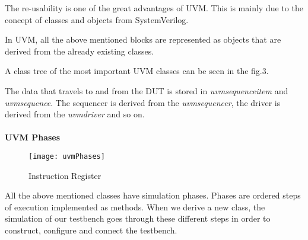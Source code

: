 \documentclass[a4paper,11pt]{article}
\begin{document}
The re-usability is one of the great advantages of UVM. This is mainly due to the concept of classes and objects from SystemVerilog.

In UVM, all the above mentioned blocks are represented as objects that are derived from the already existing classes.

A class tree of the most important UVM classes can be seen in the fig.3.

The data that travels to and from the DUT is stored in \textit{uvm\textunderscore sequence\textunderscore item} and \textit{uvm\textunderscore sequence}. The sequencer is derived from the \textit{uvm\textunderscore sequencer}, the driver is derived from the \textit{uvm\textunderscore driver} and so on.\cite{colorlesscube}
\ \\
\ \\
\textbf{UVM Phases}\cite{colorlesscube}
\ \\

\begin{figure}[ht]
\centering
\texttt{[image: uvmPhases]}
\caption{Instruction Register\cite{colorlesscube}}
\end{figure}

All the above mentioned classes have simulation phases. Phases are ordered steps of execution implemented as methods. When we derive a new class, the simulation of our testbench goes through these different steps in order to construct, configure and connect the testbench.\cite{colorlesscube}
\end{document}
